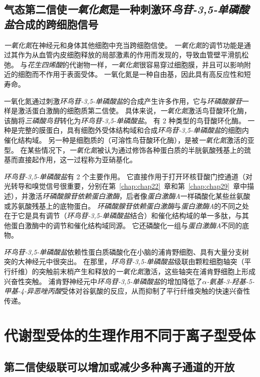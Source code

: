 \subsection{气态第二信使\textit{一氧化氮}是一种刺激环\textit{鸟苷-3,5-单磷酸盐}合成的跨细胞信号}

\textit{一氧化氮}在神经元和身体其他细胞中充当跨细胞信使。
\textit{一氧化氮}的调节功能是通过其作为从血管内皮细胞释放的局部激素的作用而发现的，导致血管壁平滑肌松弛。
与\textit{花生四烯酸}的代谢物一样，\textit{一氧化氮}很容易穿过细胞膜，并且可以影响附近的细胞而不作用于表面受体。
一氧化氮是一种自由基，因此具有高反应性和短寿命。


一氧化氮通过刺激\textit{环鸟苷-3,5-单磷酸盐}的合成产生许多作用，它与\textit{环磷酸腺苷}一样是激活蛋白激酶的细胞质第二信使。
具体来说，\textit{一氧化氮}激活鸟苷酸环化酶，该酶将\textit{三磷酸鸟苷}转化为\textit{环鸟苷-3,5-单磷酸盐}。
有 2 种类型的鸟苷酸环化酶。
一种是完整的膜蛋白，具有细胞外受体结构域和合成\textit{环鸟苷-3,5-单磷酸盐}的细胞内催化结构域。
另一种是细胞质的（可溶性鸟苷酸环化酶），是被\textit{一氧化氮}激活的亚型。
在某些情况下，\textit{一氧化氮}被认为通过修饰各种蛋白质的半胱氨酸残基上的巯基而直接起作用，这一过程称为亚硝基化。


\textit{环鸟苷-3,5-单磷酸盐}有 2 个主要作用。
它直接作用于打开环核苷酸门控通道（对光转导和嗅觉信号很重要，分别在第~\ref{chap:chap22}~章和第~\ref{chap:chap29}~章中描述），并激活\textit{环磷酸腺苷依赖蛋白激酶}，后者像\textit{蛋白激酶A}一样磷酸化某些丝氨酸或苏氨酸残基上的底物蛋白。
\textit{环磷酸腺苷依赖蛋白激酶}与\textit{蛋白激酶A}的不同之处在于它是具有调节（\textit{环鸟苷-3,5-单磷酸盐}结合）和催化结构域的单一多肽，与其他蛋白激酶中的调节和催化结构域同源。
它还磷酸化一组与\textit{蛋白激酶A}不同的底物。


\textit{环鸟苷-3,5-单磷酸盐}依赖性蛋白质磷酸化在小脑的浦肯野细胞、具有大量分支树突的大神经元中很突出。
在那里，\textit{环鸟苷-3,5-单磷酸盐}级联由颗粒细胞轴突（平行纤维）的突触前末梢产生和释放的\textit{一氧化氮}激活，这些轴突在浦肯野细胞上形成兴奋性突触。
浦肯野神经元中\textit{环鸟苷-3,5-单磷酸盐}的增加降低了\textit{$\alpha$-氨基-3-羟基-5-甲基-4-异恶唑丙酸}受体对谷氨酸的反应，从而抑制了平行纤维突触的快速兴奋性传递。



\section{代谢型受体的生理作用不同于离子型受体}

\subsection{第二信使级联可以增加或减少多种离子通道的开放}

